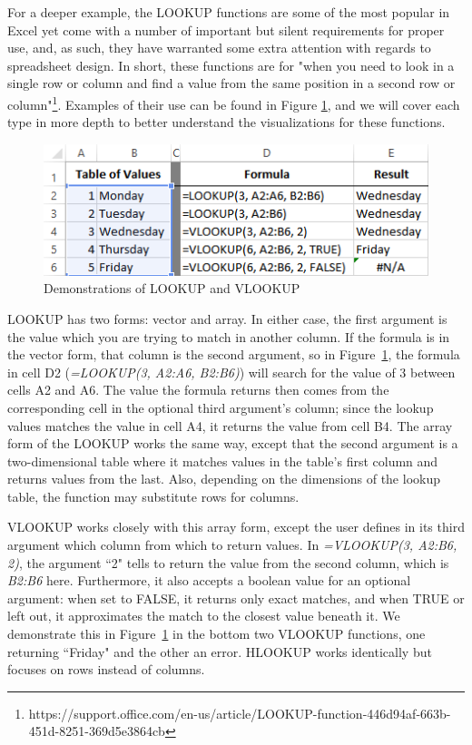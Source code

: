 \documentclass[conference]{IEEEtran}
\begin{document}
	For a deeper example, the LOOKUP functions are some of the most popular in
	Excel yet come with a number of important but silent requirements for proper
	use, and, as such, they have warranted some extra attention with regards to
	spreadsheet design. In short, these functions are for "when you need to look in
	a single row or column and find a value from the same position in a second row
	or column"\footnote{https://support.office.com/en-us/article/LOOKUP-function-446d94af-663b-451d-8251-369d5e3864cb}. Examples of their use can be found in Figure \ref{fig:lookupexample}, and we will cover each type
	in more depth to better understand the visualizations for these functions.
	
	\begin{figure}[h] \centering \includegraphics[width=.5\textwidth]{lookupexample}
		\caption{Demonstrations of LOOKUP and VLOOKUP} \label{fig:lookupexample}
	\end{figure}
	
	LOOKUP has two forms: vector and array. In either case, the first argument is
	the value which you are trying to match in another column. If the formula is in
	the vector form, that column is the second argument, so in Figure~\ref{fig:lookupexample}, 
	the formula in cell D2 (\textit{=LOOKUP(3, A2:A6,
		B2:B6)}) will search for the value of 3 between cells A2 and A6. The value the
	formula returns then comes from the corresponding cell in the optional third
	argument's column; since the lookup values matches the value in cell A4, it
	returns the value from cell B4. The array form of the LOOKUP works the same
	way, except that the second argument is a two-dimensional table where it
	matches values in the table's first column and returns values from the last.
	Also, depending on the dimensions of the lookup table, the function may
	substitute rows for columns.
	
	VLOOKUP works closely with this array form, except the user defines in its
	third argument which column from which to return values. In \textit{=VLOOKUP(3,
		A2:B6, 2)}, the argument ``2" tells to return the value from the second column,
	which is \textit{B2:B6} here. Furthermore, it also accepts a boolean value for
	an optional argument: when set to FALSE, it returns only exact matches, and
	when TRUE or left out, it approximates the match to the closest value beneath
	it. We demonstrate this in Figure~\ref{fig:lookupexample} in the bottom two
	VLOOKUP functions, one returning ``Friday" and the other an error. HLOOKUP
	works identically but focuses on rows instead of columns.
	
\end{document}
